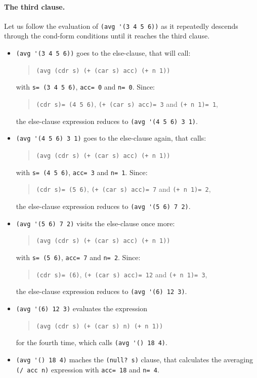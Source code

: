 \documentclass[a4paper,12pt]{book}
\begin{document}
\paragraph{The third clause.}
Let us follow the evaluation of \verb|(avg '(3 4 5 6))|
as it repeatedly  descends through the cond-form conditions
until it reaches the third clause.

\begin{itemize}
\item\verb|(avg '(3 4 5 6))|
goes to the else-clause, that will call:
\begin{quote}
\verb|(avg (cdr s) (+ (car s) acc) (+ n 1))|
\end{quote}
with
\verb|s= (3 4 5 6)|, \verb|acc= 0|
and \verb|n= 0|. Since:
\begin{quote}
\verb|(cdr s)= (4 5 6)|,
\verb|(+ (car s) acc)= 3| and
\verb|(+ n 1)= 1|,
\end{quote}
the else-clause expression reduces to
\verb|(avg '(4 5 6) 3 1)|.
\item\verb|(avg '(4 5 6) 3 1)| goes to the
else-clause again, that calls:
\begin{quote}
\verb|(avg (cdr s) (+ (car s) acc) (+ n 1))|
\end{quote}
with \verb|s= (4 5 6)|, \verb|acc= 3| and \verb|n= 1|.
Since:
\begin{quote}
\verb|(cdr s)= (5 6)|,
\verb|(+ (car s) acc)= 7| and
\verb|(+ n 1)= 2|,
\end{quote}
the else-clause expression reduces to
\verb|(avg '(5 6) 7 2)|.
\item \verb|(avg '(5 6) 7 2)| visits 
the else-clause once more:
\begin{quote}
\verb|(avg (cdr s) (+ (car s) acc) (+ n 1))|
\end{quote}
with \verb|s= (5 6)|, \verb|acc= 7| and \verb|n= 2|.
Since:
\begin{quote}
\verb|(cdr s)= (6)|,
\verb|(+ (car s) acc)= 12| and
\verb|(+ n 1)= 3|,
\end{quote}
the else-clause expression reduces to
\verb|(avg '(6) 12 3)|.
\item\verb|(avg '(6) 12 3)| evaluates the
expression
\begin{quote}
\verb|(avg (cdr s) (+ (car s) n) (+ n 1))|
\end{quote} 
for the fourth time, which calls \verb|(avg '() 18 4)|.
\item \verb|(avg '() 18 4)|  maches
the \verb|(null? s)| clause, that calculates the
averaging \verb|(/ acc n)| expression
with \verb|acc= 18| and \verb|n= 4|.
\end{itemize}
\end{document}
